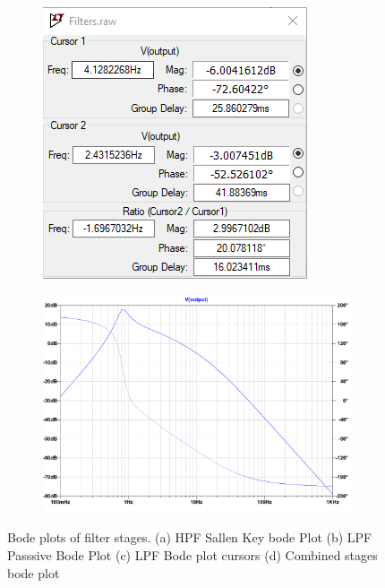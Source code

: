 \begin{figure}[]
\begin{subfigure}[]{0.35\textwidth}
  		\includegraphics[width=1\linewidth]{./Figures/LPFBodeCursor.png}
		    \caption{} \label{subfig:LPFCursor}
     \end{subfigure}
    \begin{subfigure}[]{0.62\textwidth}
              \centering
  		\includegraphics[width=1\linewidth]{./Figures/HPFLPFBode.pdf}
		    \caption{} \label{subfig:BPF}
     \end{subfigure}
  \caption[Bode plots of filter stages]{Bode plots of filter stages. (a) HPF Sallen Key bode Plot (b) LPF Passsive Bode Plot (c) LPF Bode plot cursors (d) Combined stages bode plot}
    \label{fig:filter_results}
 \end{figure}
 
